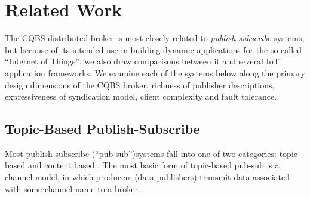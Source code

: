 \section{Related Work}


The CQBS distributed broker is most closely related to \emph{publish-subscribe} systems, but because of its intended use in building dynamic applications for the so-called ``Internet of Things'', we also draw comparisons between it and several IoT application frameworks. We examine each of the systems below along the primary design dimensions of the CQBS broker: richness of publisher descriptions, expressiveness of syndication model, client complexity and fault tolerance.

\subsection{Topic-Based Publish-Subscribe}

Most publish-subscribe (``pub-sub'')systems fall into one of two categories: topic-based and content based \cite{eugster2003many}. The most basic form of topic-based pub-sub is a channel model, in which producers (data publishers) transmit data associated with some channel name to a broker.

